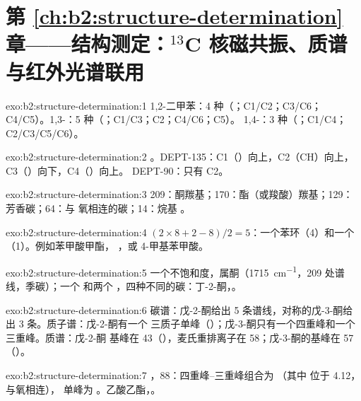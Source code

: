\section*{第 \ref{ch:b2:structure-determination} 章——结构测定：\texorpdfstring{$^{13}$C}{13C} 核磁共振、质谱与红外光谱联用}

\begin{solution}{exo:b2:structure-determination:1}
1,2-二甲苯：4 种（；C1/C2；C3/C6；C4/C5）。1,3-：5 种（；C1/C3；C2；C4/C6；C5）。
1,4-：3 种（；C1/C4；C2/C3/C5/C6）。
\end{solution}

\begin{solution}{exo:b2:structure-determination:2}
。DEPT-135：C1（）向上，C2（CH）向上，C3（）向下，C4（）向上。
DEPT-90：只有 C2。
\end{solution}

\begin{solution}{exo:b2:structure-determination:3}
209：酮羰基；170：酯（或羧酸）羰基；129：芳香碳；64：与
氧相连的碳；14：烷基 。
\end{solution}

\begin{solution}{exo:b2:structure-determination:4}
$(2 \times 8 + 2 - 8)/2 = 5$：一个苯环（4）和一个 （1）。例如苯甲酸甲酯，
，或 4-甲基苯甲酸。
\end{solution}

\begin{solution}{exo:b2:structure-determination:5}
一个不饱和度，属酮（\qty{1715}{cm^{-1}}，209 处谱线，季碳）；一个  和两个
，四种不同的碳：丁-2-酮，。
\end{solution}

\begin{solution}{exo:b2:structure-determination:6}
碳谱：戊-2-酮给出 5 条谱线，对称的戊-3-酮给出 3 条。质子谱：戊-2-酮有一个
三质子单峰（）；戊-3-酮只有一个四重峰和一个三重峰。质谱：戊-2-酮
基峰在 43（），麦氏重排离子在 58；戊-3-酮的基峰在 57
（）。
\end{solution}

\begin{solution}{exo:b2:structure-determination:7}
，88：四重峰–三重峰组合为 （其中  位于 4.12，与氧相连），
单峰为 。乙酸乙酯，。
\end{solution}

